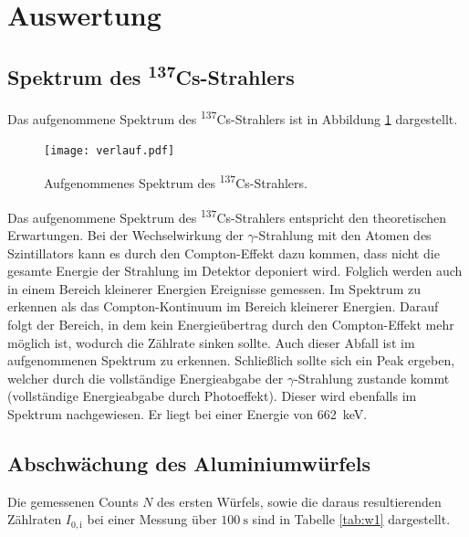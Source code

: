 \section{Auswertung}
\label{sec:Auswertung}

\subsection{Spektrum des \textsuperscript{137}Cs-Strahlers}

Das aufgenommene Spektrum des \textsuperscript{137}Cs-Strahlers ist in Abbildung
\ref{fig:verlauf} dargestellt.

\begin{figure}[H]
  \centering
  \texttt{[image: verlauf.pdf]}
  \caption{Aufgenommenes Spektrum des \textsuperscript{137}Cs-Strahlers.}
  \label{fig:verlauf}
\end{figure}

Das aufgenommene Spektrum des \textsuperscript{137}Cs-Strahlers entspricht den
theoretischen Erwartungen. Bei der Wechselwirkung der $\gamma$-Strahlung mit den
Atomen des Szintillators kann es durch den Compton-Effekt dazu kommen, dass
nicht die gesamte Energie der Strahlung im Detektor deponiert wird. Folglich werden
auch in einem Bereich kleinerer Energien Ereignisse gemessen. Im Spektrum zu erkennen
als das Compton-Kontinuum im Bereich kleinerer Energien. Darauf folgt der Bereich,
in dem kein Energieübertrag durch den Compton-Effekt mehr möglich ist, wodurch die
Zählrate sinken sollte. Auch dieser Abfall ist im aufgenommenen Spektrum zu erkennen.
Schließlich sollte sich ein Peak ergeben, welcher durch die vollständige Energieabgabe
der $\gamma$-Strahlung zustande kommt (vollständige Energieabgabe durch Photoeffekt).
Dieser wird ebenfalls im Spektrum nachgewiesen. Er liegt bei einer Energie von \SI{662}{\kilo\electronvolt}.


\subsection{Abschwächung des Aluminiumwürfels}
Die gemessenen Counts $N$ des ersten Würfels, sowie die daraus resultierenden Zählraten  $I_{0,\mathrm{i}}$ bei einer Messung
über $\SI{100}{\second}$ sind in Tabelle \ref{tab:w1} dargestellt.

